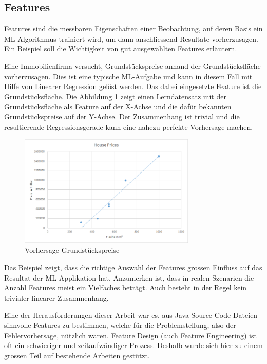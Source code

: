 \documentclass[10pt, a4paper]{article}
\begin{document}
\subsection{Features} \label{sec:features}
Features sind die messbaren Eigenschaften einer Beobachtung, auf deren Basis ein \ac{ML}-Algorithmus trainiert wird, um dann anschliessend Resultate vorherzusagen. Ein Beispiel soll die Wichtigkeit von gut ausgewählten Features erläutern. 

Eine Immobilienfirma versucht, Grundstückspreise anhand der Grund\-stücks\-flä\-che vorherzusagen. Dies ist eine typische \ac{ML}-Aufgabe und kann in diesem Fall mit Hilfe von Linearer Regression gelöst werden. Das dabei eingesetzte Feature ist die Grundstücksfläche. Die Abbildung \ref{fig:housing_prices} zeigt einen Lerndatensatz mit der Grundstücksfläche als Feature auf der X-Achse und die dafür bekannten Grundstückspreise auf der Y-Achse.
Der Zusammenhang ist trivial und die resultierende Regressionsgerade kann eine nahezu perfekte Vorhersage machen.

\begin{figure}[!ht]
	\centering
	\includegraphics[width=0.75\textwidth]{resources/images/housing_prices_with_trendline.png}
	\caption{Vorhersage Grundstückspreise}
	\label{fig:housing_prices}
\end{figure}

Das Beispiel zeigt, dass die richtige Auswahl der Features grossen Einfluss auf das Resultat der \ac{ML}-Applikation hat. Anzumerken ist, dass in realen Szenarien die Anzahl Features meist ein Vielfaches beträgt. Auch besteht in der Regel kein trivialer linearer Zusammenhang.

Eine der Herausforderungen dieser Arbeit war es, aus Java-Source-Code-Dateien sinnvolle Features zu bestimmen, welche für die Problemstellung, also der Fehlervorhersage, nützlich waren. Feature Design (auch Feature Engineering) ist oft ein schwieriger und zeitaufwändiger Prozess. Deshalb wurde sich hier zu einem grossen Teil auf bestehende Arbeiten gestützt.
\end{document}
